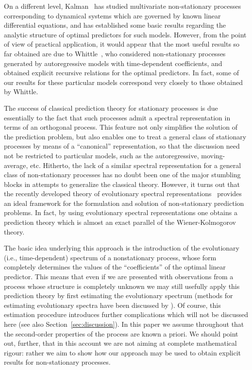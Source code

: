 \documentclass[11pt]{article}
\begin{document}
On a different level, Kalman~\cite{Kalman1960} has studied multivariate non-stationary processes corresponding to dynamical systems which are governed by known linear differential equations, and has established some basic results regarding the analytic structure of optimal predictors for such models. However, from the point of view of practical application, it would appear that the most useful results so far obtained are due to Whittle~\cite{Whittle1965}, who considered non-stationary processes generated by autoregressive models with time-dependent coefficients, and obtained explicit recursive relations for the optimal predictors. In fact, some of our results for these particular models correspond very closely to those obtained by Whittle.

The success of classical prediction theory for stationary processes is due essentially to the fact that such processes admit a spectral representation in terms of an orthogonal process. This feature not only simplifies the solution of the prediction problem, but also enables one to treat a general class of stationary processes by means of a ``canonical'' representation, so that the discussion need not be restricted to particular models, such as the autoregressive, moving-average, etc. Hitherto, the lack of a similar spectral representation for a general class of non-stationary processes has no doubt been one of the major stumbling blocks in attempts to generalize the classical theory. However, it turns out that the recently developed theory of evolutionary spectral representations~\cite{Priestley1965} provides an ideal framework for the formulation and solution of non-stationary prediction problems. In fact, by using evolutionary spectral representations one obtains a prediction theory which is almost an exact parallel of the Wiener-Kolmogorov theory.

The basic idea underlying this approach is the introduction of the evolutionary (i.e., time-dependent) spectrum of a nonstationary process, whose form completely determines the values of the ``coefficients'' of the optimal linear predictor. This means that even if we are presented with observations from a process whose structure is completely unknown we may still usefully apply this prediction theory by first estimating the evolutionary spectrum (methods for estimating evolutionary spectra have been discussed by \cite{Priestley1965,Priestley1966}). Of course, this estimation procedure introduces further complications which will not be discussed here (see also Section~\ref{sec:discussion}). In this paper we assume throughout that the second-order properties of the process are known a priori. We should point out, further, that in this account we are not aiming at complete mathematical rigour: rather we aim to show how our approach may be used to obtain explicit results for non-stationary processes.
\end{document}

